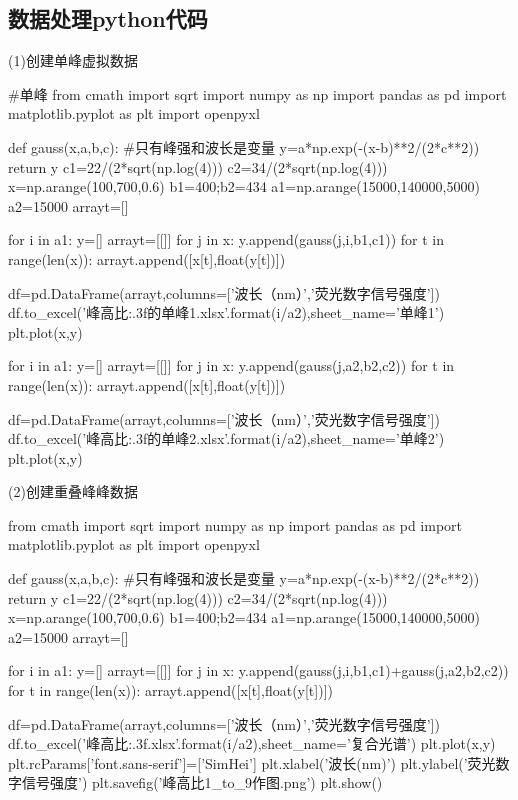 \documentclass{article}
\numberwithin{equation}{subsection}
\begin{document}
\subsection{数据处理python代码}
(1)创建单峰虚拟数据
\begin{python}
#单峰
from cmath import sqrt
import numpy as np 
import pandas as pd
import matplotlib.pyplot as plt
import openpyxl

def gauss(x,a,b,c):             #只有峰强和波长是变量
    y=a*np.exp(-(x-b)**2/(2*c**2))
    return y
c1=22/(2*sqrt(np.log(4)))
c2=34/(2*sqrt(np.log(4)))
x=np.arange(100,700,0.6)
b1=400;b2=434
a1=np.arange(15000,140000,5000)
a2=15000
arrayt=[]

for i in a1:
    y=[]
    arrayt=[[]]
    for j in x:
        y.append(gauss(j,i,b1,c1))        
    for t in range(len(x)):
        arrayt.append([x[t],float(y[t])])
    
    df=pd.DataFrame(arrayt,columns=['波长（nm）','荧光数字信号强度'])
    df.to_excel('峰高比{:.3f}的单峰1.xlsx'.format(i/a2),sheet_name='单峰1')
    plt.plot(x,y)


for i in a1:
    y=[]
    arrayt=[[]]
    for j in x:
        y.append(gauss(j,a2,b2,c2))        
    for t in range(len(x)):
        arrayt.append([x[t],float(y[t])])
    
    df=pd.DataFrame(arrayt,columns=['波长（nm）','荧光数字信号强度'])
    df.to_excel('峰高比{:.3f}的单峰2.xlsx'.format(i/a2),sheet_name='单峰2')
    plt.plot(x,y)
    
\end{python}
(2)创建重叠峰峰数据
\begin{python}
from cmath import sqrt
import numpy as np 
import pandas as pd
import matplotlib.pyplot as plt
import openpyxl

def gauss(x,a,b,c):             #只有峰强和波长是变量
    y=a*np.exp(-(x-b)**2/(2*c**2))
    return y
c1=22/(2*sqrt(np.log(4)))
c2=34/(2*sqrt(np.log(4)))
x=np.arange(100,700,0.6)
b1=400;b2=434
a1=np.arange(15000,140000,5000)
a2=15000
arrayt=[]

for i in a1:
    y=[]
    arrayt=[[]]
    for j in x:
        y.append(gauss(j,i,b1,c1)+gauss(j,a2,b2,c2))        
    for t in range(len(x)):
        arrayt.append([x[t],float(y[t])])
    
    df=pd.DataFrame(arrayt,columns=['波长（nm）','荧光数字信号强度'])
    df.to_excel('峰高比{:.3f}.xlsx'.format(i/a2),sheet_name='复合光谱')
    plt.plot(x,y)
plt.rcParams['font.sans-serif']=['SimHei']
plt.xlabel('波长(nm)')
plt.ylabel('荧光数字信号强度')
plt.savefig('峰高比1_to_9作图.png')
plt.show()   
\end{python}
\end{document}
